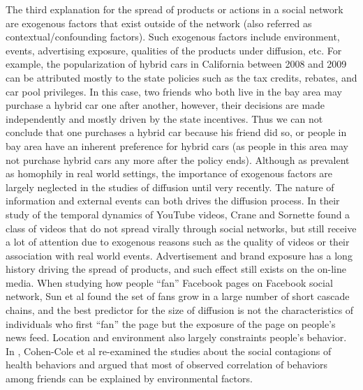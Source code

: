 \documentclass[phd,tocprelim]{cornell}
\begin{document}
The third explanation for the spread of products or actions in a social network are exogenous factors that exist outside of the network (also referred as contextual/confounding factors). Such exogenous factors include environment, events, advertising exposure, qualities of the products under diffusion, etc. For example, the popularization of hybrid cars in California between 2008 and 2009 can be attributed mostly to the state policies such as the tax credits, rebates, and car pool privileges. In this case, two friends who both live in the bay area may purchase a hybrid car one after another, however, their decisions are made independently and mostly driven by the state incentives. Thus we can not conclude that one purchases a hybrid car because his friend did so, or people in bay area have an inherent preference for hybrid cars (as people in this area may not purchase hybrid cars any more after the policy ends). Although as prevalent as homophily in real world settings, the importance of exogenous factors are largely neglected in the studies of diffusion until very recently\cite{Aral-2012}. The nature of information and external events can both drives the diffusion process. In their study of the temporal dynamics of YouTube videos, Crane and Sornette found a class of videos that do not spread virally through social networks, but still receive a lot of attention due to exogenous reasons such as the quality of videos or their association with real world events\cite{crane:2008}. Advertisement and brand exposure has a long history driving the spread of products, and such effect still exists on the on-line media. When studying how people ``fan'' Facebook pages on Facebook social network, Sun et al found the set of fans grow in a large number of short cascade chains, and the best predictor for the size of diffusion is not the characteristics of individuals who first ``fan'' the page but the exposure of the page on people's news feed\cite{Sun-2009}. Location and environment also largely constraints people's behavior. In \cite{CohenCole-2008}, Cohen-Cole et al re-examined the studies about the social contagions of health behaviors\cite{Christakis-2007,Christakis-2008,Fowler-2008} and argued that most of observed correlation of behaviors among friends can be explained by environmental factors. 
\end{document}
